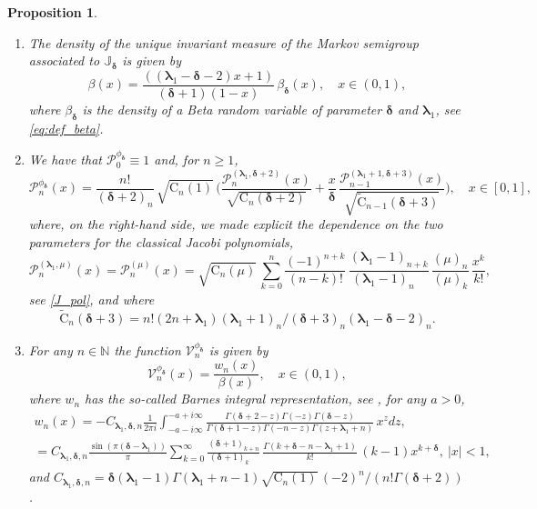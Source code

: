 \documentclass[10pt]{amsart}
\theoremstyle{plain}
\newtheorem{proposition}[theorem]{Proposition}
\theoremstyle{definition}
\newcommand{\N}{\mathbb{N}}
\renewcommand{\P}{\mathcal{P}}
\newcommand{\V}{\mathcal{V}}
\newcommand{\C}{{\mathrm{C}}}
\newcommand{\calJ}{\mathds{J}}
\newcommand{\lam}{{\bm{\lambda}_1}}
\newcommand{\mm}{{\bm{\delta}}}
\newcommand{\gab}[1][\lam,\mo]{{\beta_{#1}}}
\let\mo\mu
\let\bpsi\beta
\begin{document}
\skpt
\begin{proposition}
\label{prop:small-perturbation}
\begin{enumerate}
\item \label{item-1:prop:small-perturbation} The density of the unique invariant measure of the Markov semigroup associated to $\calJ_\mm$ is given by
\begin{equation*}
\beta(x) = \frac{((\lam - \mm - 2)x+1)}{(\mm+1)(1-x)}\, \gab[\mm](x), \quad x \in (0,1),
\end{equation*}
where $\gab[\mm]$ is the density of a Beta random variable of parameter $\mm$ and $\lam$, see \eqref{eq:def_beta}.
\item \label{item-2:prop:small-perturbation} We have that $\P_0^{\phi_\mm} \equiv 1$ and, for $n \geq 1$,
\begin{equation*}
\P_n^{\phi_\mm}(x)= \frac{n!}{(\mm+2)_n}\, \sqrt{\C_n(1)}\, \biggl( \frac{\P_n^{(\lam,\mm+2 )} (x)}{\sqrt{\C_n(\mm+2)}} + \frac{x}{\mm}\, \frac{\P_{n-1}^{(\lam+1,\mm+3)}(x)}{\sqrt{\widetilde{\C}_{n-1}(\mm+3)}} \biggr), \quad x \in [0,1],
\end{equation*}
where, on the right-hand side, we made explicit the dependence on the two parameters for the classical Jacobi polynomials, \ie
\[
\P_n^{(\lam,\mo)} (x)=\P_n^{(\mo)} (x)=\sqrt{\C_n(\mo)}\, \sum_{k=0}^n \frac{(-1)^{n+k}}{(n-k)!}\, \frac{(\lam-1)_{n+k}}{(\lam-1)_{n\phantom{+k}}}\, \frac{(\mo)_n}{(\mo)_k}\, \frac{x^k}{k!},
\]
see \eqref{J_pol}, and where
\[
\widetilde{\C}_{n}(\mm+3) = n!(2n+\lam)(\lam+1)_n / (\mm+3)_n(\lam-\mm-2)_n.
\]

\item \label{item-3:prop:small-perturbation} For any $n \in \N$ the function $\V_n^{\phi_\mm}$ is given by
\begin{equation*}
\V_n^{\phi_\mm}(x) = \frac{w_n(x)}{\bpsi(x)}, \quad x \in (0,1),
\end{equation*}
where $w_n$ has the so-called Barnes integral representation, see \eg \cite{barnes_integrals}, for any $a>0$,
\begin{multline*}
w_n(x)
= -C_{\lam, \mm, n} \frac{1}{2 \pi i} \int_{-a - i \infty}^{-a + i \infty} \frac{\Gamma(\mm+2-z)\Gamma(-z)\Gamma(\mm-z)}{\Gamma(\mm+1-z)\Gamma(-n-z)\Gamma(z+\lam+n)}\, x^{z}dz, \\
= C_{\lam, \mm, n} \frac{\sin(\pi(\mm-\lam))}{\pi} \sum_{k = 0}^{\infty} \frac{(\mm+1)_{k+n}}{(\mm+1)_{k\phantom{+n}}}\, \frac{\Gamma(k+\mm-n-\lam+1)}{k!}\,(k-1) x^{k+\mm}, \ |x|<1,
\end{multline*}
and $C_{\lam, \mm, n} = \mm(\lam - 1) \Gamma(\lam+n-1) \sqrt{\C_n(1)}\, (-2)^n / (n!\Gamma(\mm+2))$.
\end{enumerate}
\end{proposition}
\end{document}
